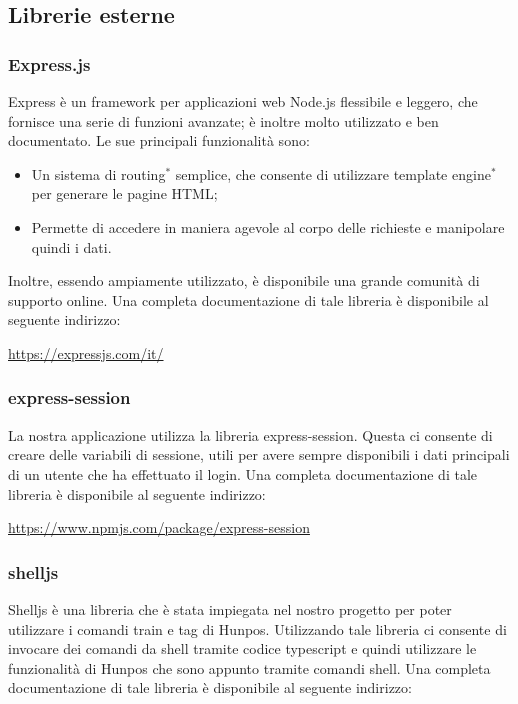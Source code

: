 \subsection{Librerie esterne}
\subsubsection{Express.js}

Express è un framework per applicazioni web Node.js flessibile e leggero, che fornisce una serie di funzioni avanzate; è inoltre molto utilizzato e ben documentato. Le sue principali funzionalità sono:
\begin{itemize}
	\item Un sistema di routing$^*$ semplice, che consente di utilizzare template engine$^*$ per generare le pagine HTML;
	\item Permette di accedere in maniera agevole al corpo delle richieste e manipolare quindi i dati.
\end{itemize}
	Inoltre, essendo ampiamente utilizzato, è disponibile una grande comunità di supporto online.
Una completa documentazione di tale libreria è disponibile al seguente indirizzo:
\begin{center}
	\url{https://expressjs.com/it/}
\end{center}
\subsubsection{express-session}
La nostra applicazione utilizza la libreria express-session. Questa ci consente di creare delle variabili di sessione, utili per avere sempre disponibili i dati principali di un utente che ha effettuato il login.
Una completa documentazione di tale libreria è disponibile al seguente indirizzo:
\begin{center}
	\url{https://www.npmjs.com/package/express-session}
\end{center}
\subsubsection{shelljs}
Shelljs è una libreria che è stata impiegata nel nostro progetto per poter utilizzare i comandi train e tag di Hunpos. Utilizzando tale libreria ci consente di invocare dei comandi da shell tramite codice typescript e quindi utilizzare le funzionalità di Hunpos che sono appunto tramite comandi shell.
Una completa documentazione di tale libreria è disponibile al seguente indirizzo:

